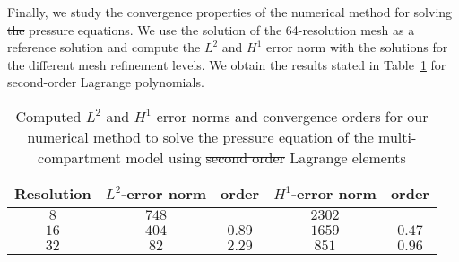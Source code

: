 \documentclass[a4paper,11pt]{article} %
\newcommand{\1}{^{(1)}}
\newcommand{\2}{^{(2)}}
\providecommand{\DIFaddtex}[1]{{\protect\color{blue}\uwave{#1}}} %
\providecommand{\DIFdeltex}[1]{{\protect\color{red}\sout{#1}}}                      %
\providecommand{\DIFdelbegin}{} %
\providecommand{\DIFdelend}{} %
\providecommand{\DIFaddFL}[1]{\DIFadd{#1}} %
\providecommand{\DIFdelFL}[1]{\DIFdel{#1}} %
\providecommand{\DIFaddbeginFL}{} %
\providecommand{\DIFaddendFL}{} %
\providecommand{\DIFdelbeginFL}{} %
\providecommand{\DIFdelendFL}{} %
\providecommand{\DIFadd}[1]{\texorpdfstring{\DIFaddtex{#1}}{#1}} %
\providecommand{\DIFdel}[1]{\texorpdfstring{\DIFdeltex{#1}}{}} %
\newcommand{\DIFscaledelfig}{0.5}
\newlength{\DIFdelgraphicswidth} %
\newlength{\DIFdelgraphicsheight} %
\newcommand{\DIFaddincludegraphics}[2][]{{\color{blue}\fbox{\DIFOincludegraphics[#1]{#2}}}} %
\newcommand{\DIFdelincludegraphics}[2][]{%
\sbox{\DIFdelgraphicsbox}{\DIFOincludegraphics[#1]{#2}}%
\settoboxwidth{\DIFdelgraphicswidth}{\DIFdelgraphicsbox} %
\settoboxtotalheight{\DIFdelgraphicsheight}{\DIFdelgraphicsbox} %
\scalebox{\DIFscaledelfig}{%
\parbox[b]{\DIFdelgraphicswidth}{\usebox{\DIFdelgraphicsbox}\\[-\baselineskip] \rule{\DIFdelgraphicswidth}{0em}}\llap{\resizebox{\DIFdelgraphicswidth}{\DIFdelgraphicsheight}{%
\setlength{\unitlength}{\DIFdelgraphicswidth}%
\begin{picture}(1,1)%
\thicklines\linethickness{2pt} %
{\color[rgb]{1,0,0}\put(0,0){\framebox(1,1){}}}%
{\color[rgb]{1,0,0}\put(0,0){\line( 1,1){1}}}%
{\color[rgb]{1,0,0}\put(0,1){\line(1,-1){1}}}%
\end{picture}%
}\hspace*{3pt}}} %
} %
\DeclareRobustCommand{\DIFdelbegin}{\DIFOdelbegin \let\includegraphics\DIFdelincludegraphics} %
\DeclareRobustCommand{\DIFdelend}{\DIFOaddend \let\includegraphics\DIFOincludegraphics} %
\DeclareRobustCommand{\DIFaddbeginFL}{\DIFOaddbeginFL \let\includegraphics\DIFaddincludegraphics} %
\DeclareRobustCommand{\DIFaddendFL}{\DIFOaddendFL \let\includegraphics\DIFOincludegraphics} %
\DeclareRobustCommand{\DIFdelbeginFL}{\DIFOdelbeginFL \let\includegraphics\DIFdelincludegraphics} %
\DeclareRobustCommand{\DIFdelendFL}{\DIFOaddendFL \let\includegraphics\DIFOincludegraphics} %
\begin{document}
Finally, we study the convergence properties of the numerical method for solving \DIFdelbegin \DIFdel{the }\DIFdelend pressure equations. We use the solution of the 64-resolution mesh as a reference solution and compute the $L^2$ and $H^1$ error norm with the solutions for the different mesh refinement levels. We obtain the results stated in Table~\ref{tab:error-pressure} for second-order Lagrange polynomials. 
\begin{table}[h]
    \centering
    \begin{tabular}{c|c|c|c|c}
         Resolution & $L^2$-error norm & order & $H^1$-error norm & order \\
         \hline 
         $8$ & $748$ & & $2302$ &  \\
         $16$ & $404$ & $0.89$ & $1659$ & $0.47$\\
         $32$ & $82$ & $2.29$ & $851$ &  $0.96$ \\
    \end{tabular}
    \caption{Computed $L^2$ and $H^1$ error norms and convergence orders for our numerical method to solve the pressure equation of the multi-compartment model using \DIFdelbeginFL \DIFdelFL{second order }\DIFdelendFL \DIFaddbeginFL \DIFaddFL{second-order }\DIFaddendFL Lagrange elements}
    \label{tab:error-pressure}
\end{table}
\FloatBarrier


\end{document}
